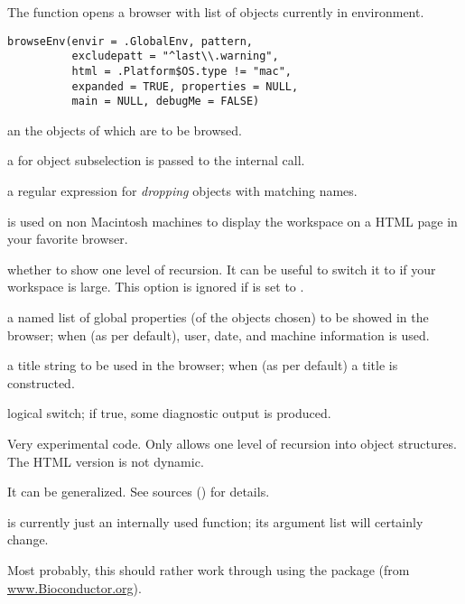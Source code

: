 %
\begin{Description}\relax
The  function opens a browser with list of objects
currently in  environment.
\end{Description}
%
\begin{Usage}
\begin{verbatim}
browseEnv(envir = .GlobalEnv, pattern,
          excludepatt = "^last\\.warning",
          html = .Platform$OS.type != "mac",
          expanded = TRUE, properties = NULL,
          main = NULL, debugMe = FALSE)
\end{verbatim}
\end{Usage}
%
\begin{Arguments}
\begin{ldescription}
\item[\code{envir}] an  the objects of which are to
be browsed.
\item[\code{pattern}] a  for object subselection
is passed to the internal  call.
\item[\code{excludepatt}] a regular expression for \emph{dropping} objects
with matching names.
\item[\code{html}] is used on non Macintosh machines to display the workspace
on a HTML page in your favorite browser.
\item[\code{expanded}] whether to show one level of recursion.  It can be useful
to switch it to  if your workspace is large.  This
option is ignored if  is set to .
\item[\code{properties}] a named list of global properties (of the objects chosen)
to be showed in the browser;  when  (as per default),
user, date, and machine information is used.
\item[\code{main}] a title string to be used in the browser; when 
(as per default) a title is constructed.
\item[\code{debugMe}] logical switch; if true, some diagnostic output is produced.
\end{ldescription}
\end{Arguments}
%
\begin{Details}\relax
Very experimental code.  Only allows one level of recursion into
object structures. The HTML version is not dynamic.

It can be generalized.  See sources
() for details.

 is currently just an internally used function;
its argument list will certainly change.

Most probably, this should rather work through using the 
package (from \url{www.Bioconductor.org}).
\end{Details}
